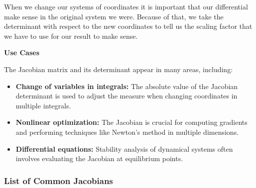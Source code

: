 When we change our systems of coordinates it is important
that our differential make sense in the original system we were.
Because of that, we take the determinant with respect to the new
coordinates to tell us the scaling factor that we have to use for our
result to make sense.
\vspace{\baselineskip}

\textbf{Use Cases}
\vspace{\baselineskip}

The Jacobian matrix and its determinant appear in many areas, including:
\begin{itemize}[label=\(-\)]
  \item \textbf{Change of variables in integrals:} The absolute value of the Jacobian determinant is used to adjust the measure when changing coordinates in multiple integrals.
  \item \textbf{Nonlinear optimization:} The Jacobian is crucial for computing gradients and performing techniques like Newton's method in multiple dimensions.
  \item \textbf{Differential equations:} Stability analysis of dynamical systems often involves evaluating the Jacobian at equilibrium points.
\end{itemize}

\subsubsection{List of Common Jacobians}

